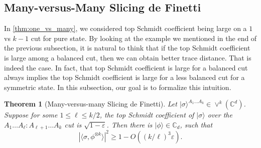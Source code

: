 \documentclass[10pt,a4paper]{article}
\newtheorem{theorem}{Theorem}[section]
\theoremstyle{remark}
\def\epsilon{\varepsilon}
\newcommand{\C}{{\mathbb C}}
\newcommand{\1}[1]{\mathds{1}{[#1]}}
\newcommand{\ket}[1]{\lvert #1\rangle}
\numberwithin{equation}{section}
\begin{document}
\subsection{Many-versus-Many Slicing de Finetti}
In \cref{thm:one_vs_many}, we considered top Schmidt coefficient being large on a $1$ vs $k-1$ cut for pure state. By looking at the example we mentioned in the end of the previous subsection, it is natural to think that if the top Schmidt coefficient is large among a balanced cut, then we can obtain better trace distance. That is indeed the case. In fact, that top Schmidt coefficient is large for a balanced cut always implies the top Schmidt coefficient is large for a less balanced cut for a symmetric state. In this subsection, our goal is to formalize this intuition. 

\begin{theorem}[Many-versus-many Slicing de Finetti]\label{thm:many-many}
Let $\ket{\sigma}^{A_1\ldots A_k} \in \vee^k(\C^d)$. Suppose for some  $1\le\ell \le k/2$, the top Schmidt coefficient of $\ket\sigma$ over the $A_1\ldots A_\ell : A_{\ell+1}\ldots A_k$ cut is $\sqrt{1-\epsilon}$. Then there is  $\ket\phi\in\C_d$, such that
\[
    |\langle \sigma, \phi^{\otimes k}\rangle|^2 \ge 1 - O( (k/\ell)^3 \epsilon).
\]
\end{theorem}
\end{document}
